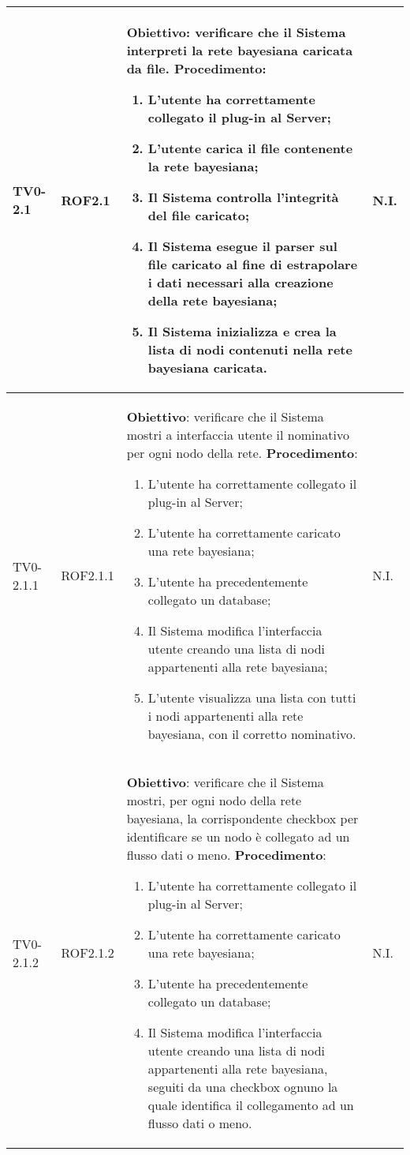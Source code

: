 \begin{longtable}{|C{.15\textwidth}|C{.13\textwidth}|m{.65\textwidth}|C{.08\textwidth}|}
TV0-2.1 & ROF2.1 &
	\textbf{Obiettivo}: verificare che il Sistema interpreti la rete bayesiana caricata da file. \newline
	\textbf{Procedimento}:
	\begin{enumerate}
		\item L'utente ha correttamente collegato il plug-in al Server;
		\item L'utente carica il file contenente la rete bayesiana;
		\item Il Sistema controlla l'integrità del file caricato;
		\item Il Sistema esegue il parser sul file caricato al fine di estrapolare i dati necessari alla creazione della rete bayesiana;
		\item Il Sistema inizializza e crea la lista di nodi contenuti nella rete bayesiana caricata.
	\end{enumerate}
	& N.I. \\
\hline

TV0-2.1.1 & ROF2.1.1 &
	\textbf{Obiettivo}: verificare che il Sistema mostri a interfaccia utente il nominativo per ogni nodo della rete. \newline
	\textbf{Procedimento}:
	\begin{enumerate}
		\item L'utente ha correttamente collegato il plug-in al Server;
		\item L'utente ha correttamente caricato una rete bayesiana;
		\item L'utente ha precedentemente collegato un database;
		\item Il Sistema modifica l'interfaccia utente creando una lista di nodi appartenenti alla rete bayesiana;
		\item L'utente visualizza una lista con tutti i nodi appartenenti alla rete bayesiana, con il corretto nominativo.
	\end{enumerate}
	& N.I. \\
\hline

TV0-2.1.2 & ROF2.1.2&
	\textbf{Obiettivo}: verificare che il Sistema mostri, per ogni nodo della rete bayesiana, la corrispondente checkbox per identificare se un nodo è collegato ad un flusso dati o meno. \newline
	\textbf{Procedimento}:
	\begin{enumerate}
		\item L'utente ha correttamente collegato il plug-in al Server;
		\item L'utente ha correttamente caricato una rete bayesiana;
		\item L'utente ha precedentemente collegato un database;
		\item Il Sistema modifica l'interfaccia utente creando una lista di nodi appartenenti alla rete bayesiana, seguiti da una checkbox ognuno la quale identifica il collegamento ad un flusso dati o meno.
	\end{enumerate}
	& N.I. \\
\hline


\end{longtable}
